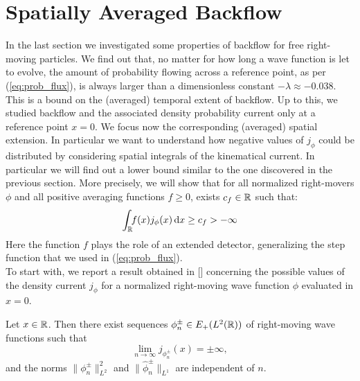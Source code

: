 \section{Spatially Averaged Backflow}
In the last section we investigated some properties of backflow for free right-moving particles. We find out that, no matter for how long a wave function is let to evolve, the amount of probability flowing across a reference point, as per (\ref{eq:prob_flux}), is always larger than a dimensionless constant $-\lambda\approx-0.038$. This is a bound on the (averaged) temporal extent of backflow. Up to this, we studied backflow and the associated density probability current only at a reference point $x=0$. We focus now the corresponding (averaged) spatial extension. In particular we want to understand how negative values of $j_\phi$ could be distributed by considering spatial integrals of the kinematical current. In particular we will find out a lower bound similar to the one discovered in the previous section. More precisely, we will show that for all normalized right-movers $\phi$ and all positive averaging functions $f\ge0$, exists $c_f\in{\mathbb R}$ such that:
\begin{equation}
\int_{{\mathbb R}}\!\! f(x)j_\phi(x)\, \mathrm d x\ge c_f>-\infty
\label{eq:spatial_bound}
\end{equation}
Here the function $f$ plays the role of an extended detector, generalizing the step function that we used in (\ref{eq:prob_flux}).\\
To start with, we report a result obtained in [\citealp{gand}] concerning the possible values of the density current $j_\phi$ for a normalized right-moving wave function $\phi$ evaluated in $x=0$.
\begin{prop}
	\label{prop:unboundedness}
	Let $x\in{\mathbb R}$. Then there exist sequences $\phi_n^\pm\in E_+(L^2({\mathbb R}))$ of right-moving wave functions such that 
	\begin{equation}
	\lim_{n\to\infty}j_{\phi_n^\pm}(x)=\pm\infty,
	\end{equation}
	and the norms $\|\phi_n^\pm\|_{L^2}^2$ and $\|\hat{\phi}_n^\pm\|_{L^1}$ are independent of $n$.
\end{prop}
